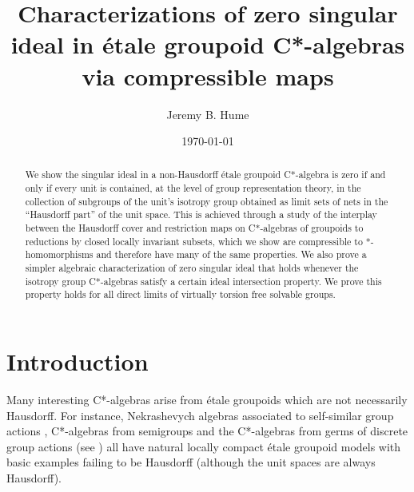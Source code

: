 \documentclass[a4paper, 12pt]{amsart}
\theoremstyle{definition}
\theoremstyle{remark}
\numberwithin{equation}{section}
\begin{document}
\date{\today}
\title[The singular ideal and compressibility]{Characterizations of zero singular ideal in \'etale groupoid C*-algebras via compressible maps}


\author[Hume]{Jeremy B. Hume}


\address{School of Mathematics and Statistics  \\
Carleton University\\ 4302 Herzberg Laboratories\\ Ottawa, ON\\ K1S 5B6, Canada}

\begin{abstract}

We show the singular ideal in a non-Hausdorff \'etale groupoid C*-algebra is zero if and only if every unit is contained, at the level of group representation theory, in the collection of subgroups of the unit's isotropy group obtained as limit sets of nets in the ``Hausdorff part'' of the unit space. This is achieved through a study of the interplay between the Hausdorff cover and restriction maps on C*-algebras of groupoids to reductions by closed locally invariant subsets, which we show are compressible to *-homomorphisms and therefore have many of the same properties. We also prove a simpler algebraic characterization of zero singular ideal that holds whenever the isotropy group C*-algebras satisfy a certain ideal intersection property. We prove this property holds for all direct limits of virtually torsion free solvable groups.
\end{abstract}



\maketitle


\section{Introduction}\label{sec:intro}
\label{s:intro}
Many interesting C*-algebras arise from \'etale groupoids which are not necessarily Hausdorff. For instance, Nekrashevych algebras associated to self-similar group actions \cite{N09}, C*-algebras from semigroups \cite{SS20} and the C*-algebras from germs of discrete group actions (see \cite{E11}) all have natural locally compact \'etale groupoid models with basic examples failing to be Hausdorff (although the unit spaces are always Hausdorff).
\end{document}
